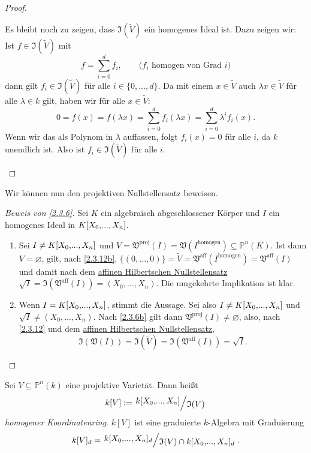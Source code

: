 \documentclass[a4paper,12pt,index=toc]{scrbook}
\theoremstyle{keinenummern} %
\def\V{\mathfrak{V}}
\def\I{\mathfrak{I}}
\def\P{\mathbb{P}}
\newcommand{\leer}{\ensuremath{\varnothing}}
\renewcommand{\dotsc}{\ensuremath{\!...}}
\newcommand{\schlange}[1]{\widetilde{#1}}
\newcommand{\ppolyx}[1][n]{\ensuremath%
  [X_{0},\dotsc,X_{#1}]}
\begin{document}
\begin{proof}
\begin{enumerate}
    Es bleibt noch zu zeigen, dass $\I(\schlange{V})$ ein homogenes Ideal ist. Dazu zeigen wir: Ist $f\in\I(\schlange{V})$ mit
    \begin{equation*} f=\sum_{i=0}^d f_i, \qquad \text{(}f_i\text{ homogen von Grad }i\text{)} \end{equation*} dann gilt $f_i\in\I(\schlange{V})$ für alle
    $i\in\{0,\dotsc,d\}$. Da mit einem $x\in\schlange{V}$ auch $\lambda x\in\schlange{V}$ für alle $\lambda\in k$ gilt, haben wir für
    alle $x\in\schlange{V}$: \begin{equation*} 0=f(x)=f(\lambda x)=\sum_{i=0}^d f_i(\lambda x) = \sum_{i=0}^d \lambda^i f_{i}(x). \end{equation*} Wenn wir das als
    Polynom in $\lambda$ auffassen, folgt $f_i(x)=0$ für alle $i$, da $k$ unendlich ist. Also ist $f_i\in\I(\schlange{V})$ für alle $i$.
  \end{enumerate}
\end{proof}

Wir können nun den projektiven Nullstellensatz beweisen.
\begin{proof}[Beweis von \cref{2.3.6}]\label{beweisprojhns}
  Sei $K$ ein algebraisch abgeschlossener Körper und $I$ ein homogenes Ideal in $K\ppolyx$.
  \begin{enumerate}
  \item[\ref{2.3.6b}] Sei $I\neq K\ppolyx$ und $V=\V^{\mathrm{proj}}(I)=\V(I^{\mathrm{homogen}})\subseteq\P^n(K)$. Ist dann
    $V=\leer$, gilt, nach \cref{2.3.12b}, $\{(0,\dotsc,0)\}=\schlange{V}=\V^{\mathrm{aff}}(I^{\mathrm{homogen}})=\V^{\mathrm{aff}}(I)$ und damit nach dem
    \hyperref[satz2c]{affinen Hilbertschen Nullstellensatz} $\sqrt{I}=\I(\V^{\mathrm{aff}}(I))=(X_0,\dotsc,X_n)$. Die umgekehrte Implikation ist
    klar.
  \item[\ref{2.3.6a}] Wenn $I=K\ppolyx$, stimmt die Aussage. Sei also $I\neq K\ppolyx$ und $\sqrt{I}\neq(X_0,\dotsc,X_n)$. Nach
    \ref{2.3.6b} gilt dann $\V^{\mathrm{proj}}(I)\neq\leer$, also,  nach \cref{2.3.12} und dem \hyperref[satz2c]{affinen Hilbertschen Nullstellensatz}, \begin{equation*}\I(\V(I))=\I(\schlange{V})=\I(\V^{\mathrm{aff}}(I))=\sqrt{I}.\end{equation*}
  \end{enumerate}
\end{proof}

\begin{dfn}\label{2.3.13}
Sei $V\subseteq\P^{n}(k)$ eine projektive Varietät. Dann heißt
\begin{equation*}k[V]:=\Quotient{k\ppolyx}{\I(V)}\end{equation*}
\emph{homogener Koordinatenring}. $k[V]$ ist eine graduierte $k$-Algebra mit Graduierung
\begin{equation*}k[V]_{d}=\Quotient{k\ppolyx_{d}}{\I(V)\cap k\ppolyx_{d}}.\end{equation*}
\end{dfn}
\end{document}
